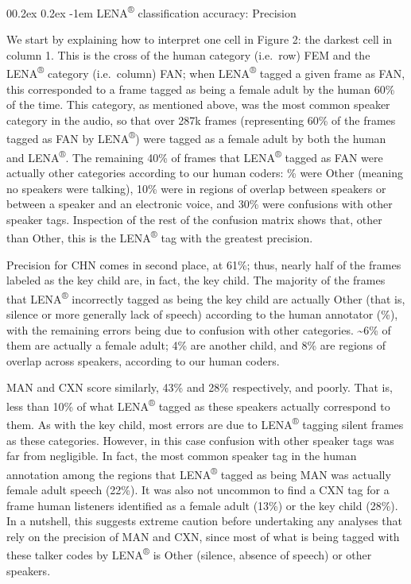 \documentclass[english,table,man,floatsintext]{apa6}
\makeatletter
\let\oldparagraph\paragraph
\renewcommand{\paragraph}[1]{\oldparagraph{#1}\mbox{}}
\renewcommand{\paragraph}{\@startsection{paragraph}{4}{\parindent}%
  {0\baselineskip \@plus 0.2ex \@minus 0.2ex}%
  {-1em}%
  {\normalfont\normalsize\bfseries\itshape\typesectitle}}
\makeatother
\begin{document}
\hypertarget{lena-classification-accuracy-precision}{%
\paragraph{\texorpdfstring{LENA\textsuperscript{®} classification accuracy: Precision}{LENA® classification accuracy: Precision}}\label{lena-classification-accuracy-precision}}

We start by explaining how to interpret one cell in Figure 2: the darkest cell in column 1. This is the cross of the human category (i.e.~row) FEM and the LENA\textsuperscript{®} category (i.e.~column) FAN; when LENA\textsuperscript{®} tagged a given frame as FAN, this corresponded to a frame tagged as being a female adult by the human 60\% of the time. This category, as mentioned above, was the most common speaker category in the audio, so that over 287k frames (representing 60\% of the frames tagged as FAN by LENA\textsuperscript{®}) were tagged as a female adult by both the human and LENA\textsuperscript{®}. The remaining 40\% of frames that LENA\textsuperscript{®} tagged as FAN were actually other categories according to our human coders: \% were Other (meaning no speakers were talking), 10\% were in regions of overlap between speakers or between a speaker and an electronic voice, and 30\% were confusions with other speaker tags. Inspection of the rest of the confusion matrix shows that, other than Other, this is the LENA\textsuperscript{®} tag with the greatest precision.

Precision for CHN comes in second place, at 61\%;
thus, nearly half of the frames labeled as the key child are, in fact, the key child. The majority of the frames that LENA\textsuperscript{®} incorrectly tagged as being the key child are actually Other (that is, silence or more generally lack of speech) according to the human annotator (\%), with the remaining errors being due to confusion with other categories. \textasciitilde{}6\% of them are actually a female adult; 4\% are another child, and 8\% are regions of overlap across speakers, according to our human coders.

MAN and CXN score similarly, 43\% and 28\% respectively, and poorly. That is, less than 10\% of what LENA\textsuperscript{®} tagged as these speakers actually correspond to them. As with the key child, most errors are due to LENA\textsuperscript{®} tagging silent frames as these categories. However, in this case confusion with other speaker tags was far from negligible. In fact, the most common speaker tag in the human annotation among the regions that LENA\textsuperscript{®} tagged as being MAN was actually female adult speech (22\%). It was also not uncommon to find a CXN tag for a frame human listeners identified as a female adult (13\%) or the key child (28\%). In a nutshell, this suggests extreme caution before undertaking any analyses that rely on the precision of MAN and CXN, since most of what is being tagged with these talker codes by LENA\textsuperscript{®} is Other (silence, absence of speech) or other speakers.
\end{document}
